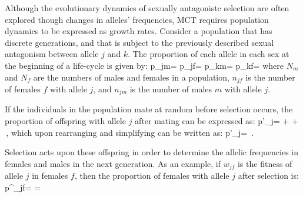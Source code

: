 \documentclass[12pt]{article}
\let\oldequation\equation
\let\oldendequation\endequation
\renewenvironment{equation}
  {\linenomathNonumbers\oldequation}
  {\oldendequation\endlinenomath}
\begin{document}
Although the evolutionary dynamics of sexually antagonistc selection are often explored though changes in alleles' frequencies, MCT requires population dynamics to be expressed as growth rates. Consider a population that has discrete generations, and that is subject to the previously described sexual antagonism between allele $j$ and $k$. The proportion of each allele in each sex at the beginning of a life-cycle is given by:
\begin{equation}
    p_{jm}= 
    \label{first_pop}
\end{equation}
\begin{equation}
    p_{jf}= 
\end{equation}
\begin{equation}
    p_{km}= 
\end{equation}
\begin{equation}
    p_{kf}= 
\end{equation}
where $N_m$ and $N_f$ are the numbers of males and females in a population, $n_{jf}$ is the number of females $f$ with allele $j$, and $n_{jm}$ is the number of males $m$ with allele $j$.

If the individuals in the population mate at random before selection occurs, the proportion of offspring with allele $j$ after mating can be expressed as:
\begin{equation}
   p'_{j}=   +    +
     \,,
\end{equation}
which upon rearranging and simplifying can be written as:
\begin{equation}
   p'_{j}=  \,.
   \label{pprime}
\end{equation}

Selection acts upon these offspring in order to determine the allelic frequencies in females and males in the next generation. As an example, if $w_{jf}$ is the fitness of allele $j$ in females $f$, then the proportion of females with allele $j$ after selection is:
\begin{equation}
   p^{\prime}_{jf}=  = 
\end{equation}
\end{document}
